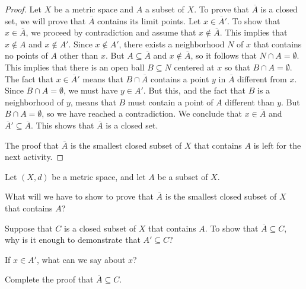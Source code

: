 \begin{proof} Let $X$ be a metric space and $A$ a subset of $X$. To prove that $\overline{A}$ is a closed set, we will prove that $\overline{A}$ contains its limit points. Let $x \in \overline{A}'$. To show that $x \in \overline{A}$, we proceed by contradiction and assume that $x \notin \overline{A}$. This implies that $x \notin A$ and $x \notin A'$. Since $x \notin A'$, there exists a neighborhood $N$ of $x$ that contains no points of $A$ other than $x$. But $A \subseteq \overline{A}$ and $x \notin \overline{A}$, so it follows that $N \cap A = \emptyset$. This implies that there is an open ball $B \subseteq N$ centered at $x$ so that $B \cap A = \emptyset$. The fact that $x \in \overline{A}'$ means that $B \cap \overline{A}$ contains a point $y$ in $\overline{A}$ different from $x$. Since $B \cap A = \emptyset$, we must have $y \in A'$. But this, and the  fact that $B$ is a neighborhood of $y$, means that $B$ must contain a point of $A$ different than $y$. But $B \cap A = \emptyset$, so we have reached a contradiction. We conclude that $x \in \overline{A}$ and $\overline{A}' \subseteq \overline{A}$. This shows that $\overline{A}$ is a closed set. 

The proof that $\overline{A}$ is the smallest closed subset of $X$ that contains $A$ is left for the next activity.
\end{proof}

\begin{activity} Let $(X,d)$ be a metric space, and let $A$ be a subset of $X$. 
\ba
\item What will we have to show to prove that $\overline{A}$ is the smallest closed subset of $X$ that contains $A$?

\item Suppose that $C$ is a closed subset of $X$ that contains $A$. To show that $\overline{A} \subseteq C$, why is it enough to demonstrate that $A' \subseteq C$? 

\item If $x \in A'$, what can we say about $x$? 

\item Complete the proof that $\overline{A} \subseteq C$.

\ea

\end{activity}

